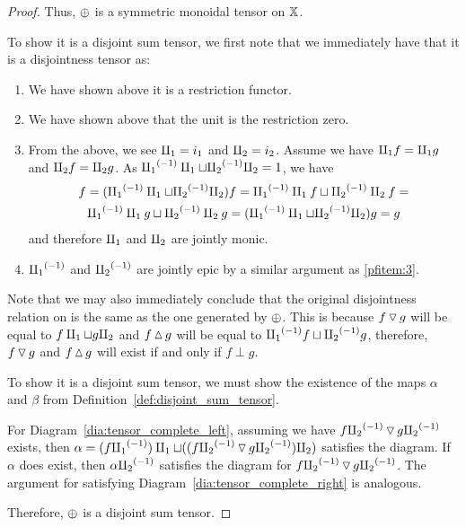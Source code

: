 \begin{proof}
  Thus, $\oplus$ is a symmetric monoidal tensor on $\mathbb{X}$.

  To show it is a disjoint sum tensor, we first note that we immediately have that it is a
  disjointness tensor as:
    \begin{enumerate}[{(}i{)}]
      \item We have shown above it is a restriction functor.
      \item We have shown above that the unit is the restriction zero.
      \item From the above, we see $\amalg_{1} = i_1$ and $\amalg_{2} = i_2$. Assume we have $\amalg_{1} f = \amalg_{1} g$
        and $\amalg_{2} f = \amalg_{2} g$. As ${\amalg_{1}}^{(-1)} \amalg_{1} \sqcup {\amalg_{2}}^{(-1)} \amalg_{2} = 1$, we have
        \begin{multline*}
           f = ({\amalg_{1}}^{(-1)} \amalg_{1} \sqcup {\amalg_{2}}^{(-1)} \amalg_{2}) f = {\amalg_{1}}^{(-1)} \amalg_{1} f \sqcup {\amalg_{2}}^{(-1)} \amalg_{2} f = \\
           {\amalg_{1}}^{(-1)} \amalg_{1} g \sqcup {\amalg_{2}}^{(-1)} \amalg_{2} g =  ({\amalg_{1}}^{(-1)} \amalg_{1} \sqcup {\amalg_{2}}^{(-1)} \amalg_{2}) g = g
        \end{multline*}
        and therefore $\amalg_{1}$ and $\amalg_{2}$ are jointly monic.\label{pfitem:3}
      \item ${\amalg_{1}}^{(-1)}$ and ${\amalg_{2}}^{(-1)}$ are jointly epic by a similar argument as \ref{pfitem:3}.
    \end{enumerate}

  Note that we may also immediately conclude that the original disjointness relation on \X is the
  same as the one generated by $\oplus$. This is because $f \operatorname{\triangledown} g$ will be equal to $f\amalg_{1} \sqcup
  g\amalg_{2}$ and $f \operatorname{\vartriangle} g$ will be equal to ${\amalg_{1}}^{(-1)} f \sqcup {\amalg_{2}}^{(-1)} g$, therefore, $f\operatorname{\triangledown} g$ and $f
  \operatorname{\vartriangle} g$ will exist if and only if $f\perp g$.

  To show it is a disjoint sum tensor, we must show the existence of the maps $\alpha$ and $\beta$
  from Definition~\ref{def:disjoint_sum_tensor}.

  For Diagram~\ref{dia:tensor_complete_left}, assuming we have $f{\amalg_{2}}^{(-1)} \operatorname{\triangledown} g{\amalg_{2}}^{(-1)}$ exists,
  then $\alpha = (f{\amalg_{1}}^{(-1)})\amalg_{1} \sqcup ((f{\amalg_{2}}^{(-1)} \operatorname{\triangledown} g {\amalg_{2}}^{(-1)})\amalg_{2})$ satisfies the diagram. If
  $\alpha$ does exist, then $\alpha {\amalg_{2}}^{(-1)}$ satisfies the diagram for $f{\amalg_{2}}^{(-1)} \operatorname{\triangledown} g{\amalg_{2}}^{(-1)}$. The
  argument for satisfying Diagram~\ref{dia:tensor_complete_right} is analogous.

  Therefore, $\oplus$ is a disjoint sum tensor.
\end{proof}



